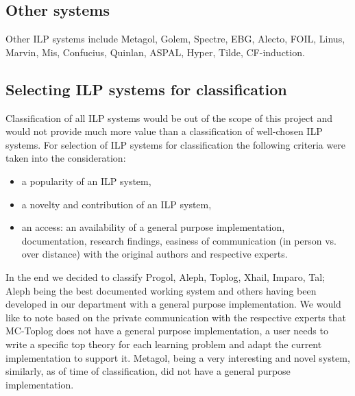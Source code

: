 \subsection{Other systems}
Other ILP systems include Metagol, Golem, Spectre, EBG, Alecto, FOIL, Linus, Marvin, Mis, Confucius, Quinlan, ASPAL, Hyper,  Tilde, CF-induction.

\subsection{Selecting ILP systems for classification}
Classification of all ILP systems would be out of the scope of this project and would not provide much more value than a classification of well-chosen ILP systems.
For selection of ILP systems for classification the following criteria were taken into the consideration:

\begin{itemize}
\item a popularity of an ILP system,
\item a novelty and contribution of an ILP system,
\item an access: an availability of a general purpose implementation, documentation, research findings, easiness of communication (in person vs. over distance) with the original authors and respective experts.
\end{itemize}

In the end we decided to classify Progol, Aleph, Toplog, Xhail, Imparo, Tal; Aleph being the best documented working system and others having been developed in our department with a general purpose implementation. We would like to note based on the private communication with the respective experts that MC-Toplog does not have a general purpose implementation, a user needs to write a specific top theory for each learning problem and adapt the current implementation to support it. Metagol\cite{muggleton2014meta}, being a very interesting and novel system, similarly, as of time of classification, did not have a general purpose implementation.